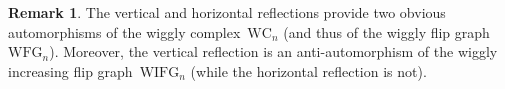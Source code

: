 \documentclass{amsart}
\theoremstyle{definition}
\newtheorem{remark}[theorem]{Remark}
\newcommand{\wigglyComplex}{\mathrm{WC}} %
\newcommand{\wigglyFlipGraph}{\mathrm{WFG}} %
\newcommand{\wigglyIncreasingFlipGraph}{\mathrm{WIFG}} %
\begin{document}

\begin{remark}
\label{rem:wigglyComplexAutomorphism}
The vertical and horizontal reflections provide two obvious automorphisms of the wiggly complex~$\wigglyComplex_n$ (and thus of the wiggly flip graph~$\wigglyFlipGraph_n$).
Moreover, the vertical reflection is an anti-automorphism of the wiggly increasing flip graph~$\wigglyIncreasingFlipGraph_n$ (while the horizontal reflection is not).
\end{remark}
\end{document}
